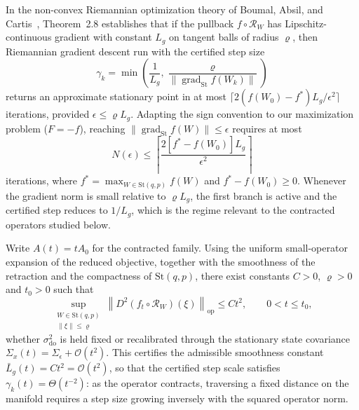 \documentclass[preprint,12pt]{elsarticle}
\begin{document}
In the non-convex Riemannian optimization theory of Boumal, Absil, and Cartis~\cite{Boumal2019,Boumal2019erratum}, Theorem~2.8 establishes that if the pullback $f \circ \mathcal{R}_W$ has Lipschitz-continuous gradient with constant $L_g$ on tangent balls of radius $\varrho$, then Riemannian gradient descent run with the certified step size
\begin{equation}
\gamma_k = \min\!\left( \frac{1}{L_g}, \frac{\varrho}{\|\operatorname{grad}_{\mathrm{St}} f(W_k)\|} \right)
\label{eq:prescribed_step}
\end{equation}
returns an approximate stationary point in at most $\lceil 2 (f(W_0) - f^*) L_g / \epsilon^2 \rceil$ iterations, provided $\epsilon \le \varrho L_g$. Adapting the sign convention to our maximization problem ($F = -f$), reaching $\|\operatorname{grad}_{\mathrm{St}} f(W)\| \le \epsilon$ requires at most
\begin{equation}
N(\epsilon) \le \left\lceil \frac{2 \left[ f^* - f(W_0) \right] L_g}{\epsilon^2} \right\rceil
\label{eq:iteration_bound}
\end{equation}
iterations, where $f^* = \max_{W \in \mathrm{St}(q,p)} f(W)$ and $f^* - f(W_0) \ge 0$. Whenever the gradient norm is small relative to $\varrho L_g$, the first branch is active and the certified step reduces to $1/L_g$, which is the regime relevant to the contracted operators studied below.

Write $A(t) = t A_0$ for the contracted family. Using the uniform small-operator expansion of the reduced objective, together with the smoothness of the retraction and the compactness of $\mathrm{St}(q, p)$, there exist constants $C > 0$, $\varrho > 0$ and $t_0 > 0$ such that
\begin{equation}
\sup_{\substack{W \in \mathrm{St}(q, p) \\ \|\xi\| \le \varrho}} \left\| D^2 (f_t \circ \mathcal{R}_W)(\xi) \right\|_{\mathrm{op}} \le C t^2, \qquad 0 < t \le t_0,
\label{eq:pullback_hessian_bound}
\end{equation}
whether $\sigma_{\mathrm{do}}^2$ is held fixed or recalibrated through the stationary state covariance $\Sigma_x(t) = \Sigma_\epsilon + \mathcal{O}(t^2)$. This certifies the admissible smoothness constant $\bar{L}_g(t) = C t^2 = \mathcal{O}(t^2)$, so that the certified step scale satisfies $\gamma_k(t) = \Theta(t^{-2})$: as the operator contracts, traversing a fixed distance on the manifold requires a step size growing inversely with the squared operator norm.
\end{document}

